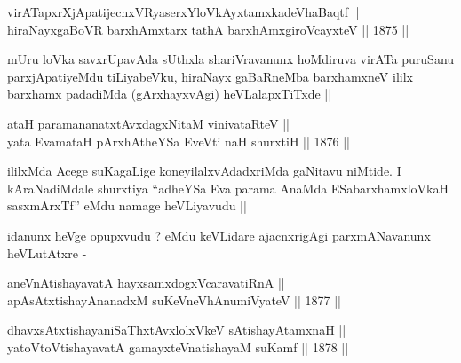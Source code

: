 
\begin{shl}
virATapxrXjApatijecnxVRyaserxYloVkAyxtamxkadeVhaBaqtf || \\
hiraNayxgaBoVR barxhAmx\s tarx tathA barxhAmxgiroVcayxteV ||  1875 ||  
\end{shl}

\begin{artha}
mUru loVka savxrUpavAda sUthxla shariVravanunx hoMdiruva virATa
puruSanu parxjApatiyeMdu tiLiyabeVku, hiraNayx gaBaRneMba barxhamxneV
ililx barxhamx padadiMda (gArxhayxvAgi) heVLalapxTiTxde ||
\end{artha}


\begin{shl}
ataH paramananatxtAvxdagxNitaM vinivataRteV || \\
yata EvamataH pArxhAtheYSa EveVti naH shurxtiH ||  1876 ||  
\end{shl}

\begin{artha}
ililxMda Acege suKagaLige koneyilalxvAdadxriMda gaNitavu niMtide. I
kAraNadiMdale shurxtiya ``adheYSa Eva parama AnaMda ESabarxhamxloVkaH
sasxmArxTf'' eMdu namage heVLiyavudu ||
\end{artha}

\begin{artha}
idanunx heVge opupxvudu ? eMdu keVLidare ajacnxrigAgi parxmANavanunx heVLutAtxre -
\end{artha}

\begin{shl}
aneVnAtishayavatA hayxsamxdogxVcaravatiRnA || \\
apAsAtxtishayAnanadxM suKeVneVhAnumiVyateV ||  1877 ||  
\end{shl}

\begin{shl}
dhavxsAtxtishayaniSaThxtAvxlolxVkeV sAtishayAtamxnaH ||  \\
yatoV\s toV\s tishayavatA gamayxteV\s natishayaM suKamf ||  1878 ||  
\end{shl}

